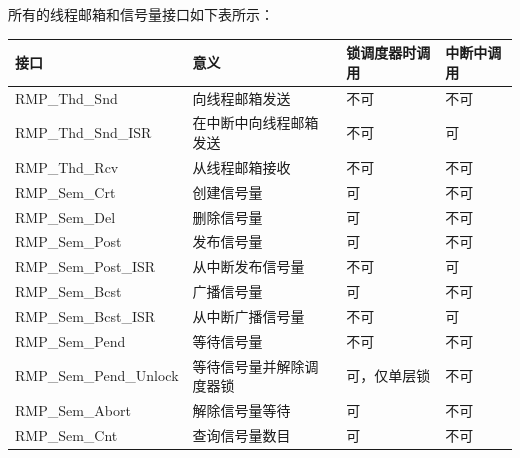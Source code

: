 所有的线程邮箱和信号量接口如下表所示：

\label{tab:thread-mailbox-and-semaphore-interface-summary}

{\def\LTcaptype{none} %
\begin{longtable}[]{@{}
  >{\raggedright\arraybackslash}p{}
  >{\raggedright\arraybackslash}p{}
  >{\raggedright\arraybackslash}p{}
  >{\raggedright\arraybackslash}p{}@{}}
\toprule\noalign{}
\begin{minipage}[b]{\linewidth}\raggedright
接口
\end{minipage} & \begin{minipage}[b]{\linewidth}\raggedright
意义
\end{minipage} & \begin{minipage}[b]{\linewidth}\raggedright
锁调度器时调用
\end{minipage} & \begin{minipage}[b]{\linewidth}\raggedright
中断中调用
\end{minipage} \\
\midrule\noalign{}
\endhead
\bottomrule\noalign{}
\endlastfoot
RMP\_Thd\_Snd & 向线程邮箱发送 & 不可 & 不可 \\
RMP\_Thd\_Snd\_ISR & 在中断中向线程邮箱发送 & 不可 & 可 \\
RMP\_Thd\_Rcv & 从线程邮箱接收 & 不可 & 不可 \\
RMP\_Sem\_Crt & 创建信号量 & 可 & 不可 \\
RMP\_Sem\_Del & 删除信号量 & 可 & 不可 \\
RMP\_Sem\_Post & 发布信号量 & 可 & 不可 \\
RMP\_Sem\_Post\_ISR & 从中断发布信号量 & 不可 & 可 \\
RMP\_Sem\_Bcst & 广播信号量 & 可 & 不可 \\
RMP\_Sem\_Bcst\_ISR & 从中断广播信号量 & 不可 & 可 \\
RMP\_Sem\_Pend & 等待信号量 & 不可 & 不可 \\
RMP\_Sem\_Pend\_Unlock & 等待信号量并解除调度器锁 & 可，仅单层锁 &
不可 \\
RMP\_Sem\_Abort & 解除信号量等待 & 可 & 不可 \\
RMP\_Sem\_Cnt & 查询信号量数目 & 可 & 不可 \\
\end{longtable}
}

